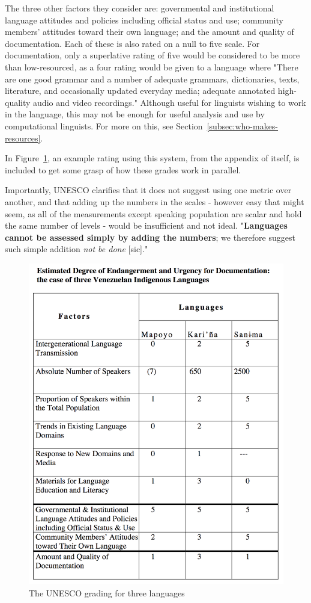 The three other factors they consider are: governmental and institutional language attitudes and policies including official status and use; community members' attitudes toward their own language; and the amount and quality of documentation. Each of these is also rated on a null to five scale. For documentation, only a superlative rating of five would be considered to be more than low-resourced, as a four rating would be given to a language where "There are one good grammar and a number of adequate grammars, dictionaries, texts, literature, and occasionally updated everyday media; adequate annotated high-quality audio and video recordings." Although useful for linguists wishing to work in the language, this may not be enough for useful analysis and use by computational linguists. For more on this, see Section~\ref{subsec:who-makes-resources}.

In Figure~\ref{fig:unesco}, an example rating using this system, from the appendix of \citet{brenzinger2003language} itself, is included to get some grasp of how these grades work in parallel.

Importantly, UNESCO clarifies that it does not suggest using one metric over another, and that adding up the numbers in the scales - however easy that might seem, as all of the measurements except speaking population are scalar and hold the same number of levels - would be insufficient and not ideal. "\textbf{Languages cannot be assessed simply by adding the numbers}; we therefore suggest such simple addition \textit{not be done} [sic]."

\begin{figure}
 \centering
 \includegraphics[width=.5\textwidth]{img/unesco.png}
 \caption{The UNESCO grading for three languages \citep[23]{brenzinger2003language}}
 \label{fig:unesco}
\end{figure}

